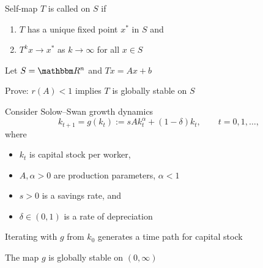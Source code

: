 \begin{frame}
    
    Self-map $T$ is called  on $S$
    if 
    \begin{enumerate}
        \item $T$ has a unique fixed point $x^*$ in $S$ and
            \vspace{0.4em}
        \item $T^k x \to x^*$ as $k \to \infty$ for all $x \in S$  
    \end{enumerate}

    \vspace{1em}
    \vspace{1em}

    \Eg Let $S = \RR^n$ and $Tx = Ax + b$

            \vspace{0.4em}
    \Ex Prove: $r(A) < 1$ implies $T$ is globally stable on $S$

\end{frame}



\begin{frame}
    
    \Eg Consider Solow--Swan growth dynamics 
    \begin{equation*}
        \label{eq:solow}
        k_{t+1} = g(k_t) := s A k_t^\alpha + (1 - \delta) k_t,
        \qquad t = 0, 1, \ldots,
    \end{equation*}
    where 
    \begin{itemize}
        \item $k_t$ is capital stock per worker,
        \item $A, \alpha >0$ are production parameters, $\alpha < 1$
        \item $s > 0$ is a savings rate, and
        \item $\delta \in (0,1)$ is a rate of depreciation  
    \end{itemize}

    Iterating with $g$ from $k_0$ generates a time path for capital stock

    The map $g$ is globally stable on $(0, \infty)$

\end{frame}

